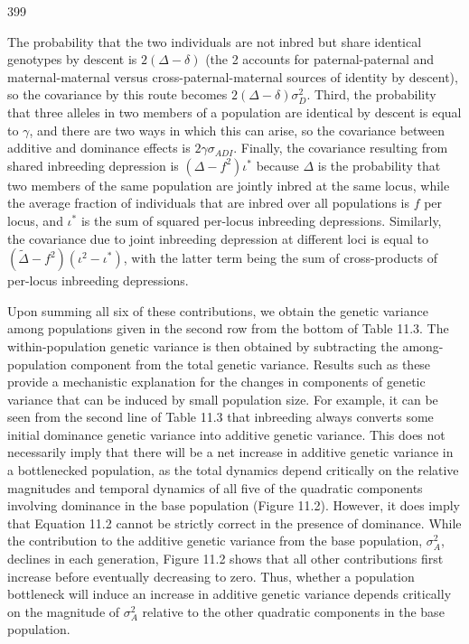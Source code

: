 \documentclass{article}
\begin{document}
399

The probability that the two individuals are not inbred but share identical genotypes by descent is  $ 2(\Delta - \delta) $ (the 2 accounts for paternal-paternal and maternal-maternal versus cross-paternal-maternal sources of identity by descent), so the covariance by this route becomes  $ 2(\Delta - \delta)\sigma_D^2 $. Third, the probability that three alleles in two members of a population are identical by descent is equal to  $ \gamma $, and there are two ways in which this can arise, so the covariance between additive and dominance effects is  $ 2\gamma\sigma_{ADI} $. Finally, the covariance resulting from shared inbreeding depression is  $ (\Delta - f^2)\iota^* $ because  $ \Delta $ is the probability that two members of the same population are jointly inbred at the same locus, while the average fraction of individuals that are inbred over all populations is  $ f $ per locus, and  $ \iota^* $ is the sum of squared per-locus inbreeding depressions. Similarly, the covariance due to joint inbreeding depression at different loci is equal to  $ (\widetilde{\Delta} - f^2)(\iota^2 - \iota^*) $, with the latter term being the sum of cross-products of per-locus inbreeding depressions.

Upon summing all six of these contributions, we obtain the genetic variance among populations given in the second row from the bottom of Table 11.3. The within-population genetic variance is then obtained by subtracting the among-population component from the total genetic variance. Results such as these provide a mechanistic explanation for the changes in components of genetic variance that can be induced by small population size. For example, it can be seen from the second line of Table 11.3 that inbreeding always converts some initial dominance genetic variance into additive genetic variance. This does not necessarily imply that there will be a net increase in additive genetic variance in a bottlenecked population, as the total dynamics depend critically on the relative magnitudes and temporal dynamics of all five of the quadratic components involving dominance in the base population (Figure 11.2). However, it does imply that Equation 11.2 cannot be strictly correct in the presence of dominance. While the contribution to the additive genetic variance from the base population,  $ \sigma_{A}^{2} $, declines in each generation, Figure 11.2 shows that all other contributions first increase before eventually decreasing to zero. Thus, whether a population bottleneck will induce an increase in additive genetic variance depends critically on the magnitude of  $ \sigma_{A}^{2} $ relative to the other quadratic components in the base population.
\end{document}
